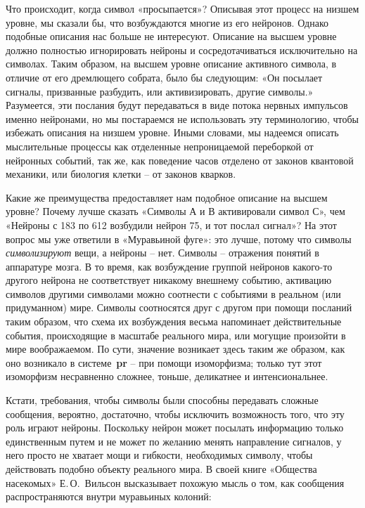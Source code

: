 \documentclass[../main.tex]{subfiles}
\begin{document}
Что происходит, когда символ «просыпается»? Описывая этот процесс на низшем уровне, мы сказали бы, что возбуждаются многие из его нейронов. Однако подобные описания нас больше не интересуют. Описание на высшем уровне должно полностью игнорировать нейроны и сосредотачиваться исключительно на символах. Таким образом, на высшем уровне описание активного символа, в отличие от его дремлющего собрата, было бы следующим: «Он посылает сигналы, призванные разбудить, или активизировать, другие символы.» Разумеется, эти послания будут передаваться в виде потока нервных импульсов именно нейронами, но мы постараемся не использовать эту терминологию, чтобы избежать описания на низшем уровне. Иными словами, мы надеемся описать мыслительные процессы как отделенные непроницаемой переборкой от нейронных событий, так же, как поведение часов отделено от законов квантовой механики, или биология клетки \--- от законов кварков.

Какие же преимущества предоставляет нам подобное описание на высшем уровне? Почему лучше сказать «Символы А и В активировали символ С», чем «Нейроны с 183 по 612 возбудили нейрон 75, и тот послал сигнал»? На этот вопрос мы уже ответили в «Муравьиной фуге»: это лучше, потому что символы \emph{символизируют} вещи, а нейроны \--- нет. Символы \--- отражения понятий в аппаратуре мозга. В то время, как возбуждение группой нейронов какого-то другого нейрона не соответствует никакому внешнему событию, активацию символов другими символами можно соотнести с событиями в реальном (или придуманном) мире. Символы соотносятся друг с другом при помощи посланий таким образом, что схема их возбуждения весьма напоминает действительные события, происходящие в масштабе реального мира, или могущие произойти в мире воображаемом. По сути, значение возникает здесь таким же образом, как оно возникало в системе~\textbf{pr} \--- при помощи изоморфизма; только тут этот изоморфизм несравненно сложнее, тоньше, деликатнее и интенсиональнее.

Кстати, требования, чтобы символы были способны передавать сложные сообщения, вероятно, достаточно, чтобы исключить возможность того, что эту роль играют нейроны. Поскольку нейрон может посылать информацию только единственным путем и не может по желанию менять направление сигналов, у него просто не хватает мощи и гибкости, необходимых символу, чтобы действовать подобно объекту реального мира. В своей книге «Общества насекомых» Е.\,О.~Вильсон высказывает похожую мысль о том, как сообщения распространяются внутри муравьиных колоний:
\end{document}

